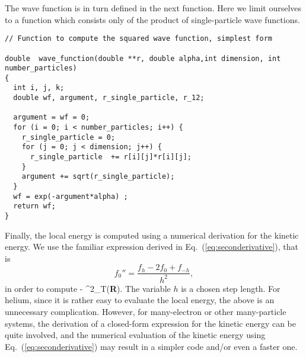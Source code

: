 The wave function is in turn defined in the next function.
Here we limit ourselves to   a function which consists only of 
the product of single-particle wave
functions.
\begin{lstlisting}
// Function to compute the squared wave function, simplest form 

double  wave_function(double **r, double alpha,int dimension, int number_particles)
{
  int i, j, k;
  double wf, argument, r_single_particle, r_12;
  
  argument = wf = 0;
  for (i = 0; i < number_particles; i++) { 
    r_single_particle = 0;
    for (j = 0; j < dimension; j++) { 
      r_single_particle  += r[i][j]*r[i][j];
    }
    argument += sqrt(r_single_particle);
  }
  wf = exp(-argument*alpha) ;
  return wf;
}
\end{lstlisting}
Finally, the local energy is computed using a numerical derivation for the kinetic 
energy.
We use the familiar expression derived in
Eq.~(\ref{eq:seconderivative}), that is
\[
 f_0''=\frac{ f_h -2f_0 +f_{-h}}{h^2},
\]
in order to compute 
\be 
  - \nabla^2\psi_T({\bf R}). 
\ee
The variable $h$ is a chosen step length. For helium, since it is
rather easy to evaluate the local energy, the above is an unnecessary
complication. However, for many-electron or other many-particle systems,
the derivation of a closed-form expression for the kinetic energy can be 
quite involved, and the numerical evaluation of the kinetic
energy using  Eq.~(\ref{eq:seconderivative}) may result in a simpler
code and/or even a faster one. 
